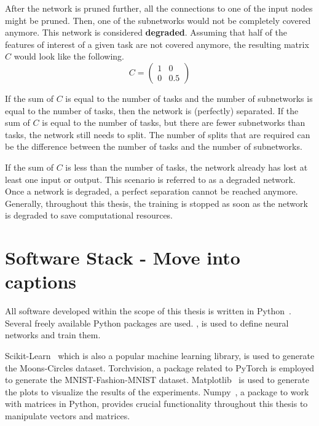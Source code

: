 After the network is pruned further, all the connections to one of the input nodes might be pruned.
Then, one of the subnetworks would not be completely covered anymore.
This network is considered \textbf{degraded}.
Assuming that half of the features of interest of a given task are not covered anymore, the resulting matrix $C$ would look like the following.
\[ C = \begin{pmatrix} 1 & 0 \\ 0 & 0.5 \end{pmatrix} \]

If the sum of $C$ is equal to the number of tasks and the number of subnetworks is equal to the number of tasks, then the network is (perfectly) separated.
If the sum of $C$ is equal to the number of tasks, but there are fewer subnetworks than tasks, the network still needs to split.
The number of splits that are required can be the difference between the number of tasks and the number of subnetworks.

If the sum of $C$ is less than the number of tasks, the network already has lost at least one input or output.
This scenario is referred to as a degraded network.
Once a network is degraded, a perfect separation cannot be reached anymore.
Generally, throughout this thesis, the training is stopped as soon as the network is degraded to save computational resources.

\section{Software Stack - Move into captions}
All software developed within the scope of this thesis is written in Python~\autocite{python}.
Several freely available Python packages are used.
, is used to define neural networks and train them.

Scikit-Learn~\autocite{sklearn} which is also a popular machine learning library, is used to generate the Moons-Circles dataset.
Torchvision, a package related to PyTorch is employed to generate the MNIST-Fashion-MNIST dataset.
Matplotlib~\autocite{matplotlib} is used to generate the plots to visualize the results of the experiments.
Numpy~\autocite{numpy}, a package to work with matrices in Python, provides crucial functionality throughout this thesis to manipulate vectors and matrices.